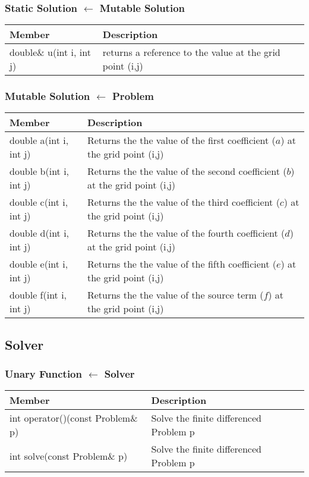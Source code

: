 \documentclass{article}
\begin{document}
\subsubsection{Static Solution $\leftarrow$ Mutable Solution}

\begin{tabular}[!htb]{|p{5.25 cm}|p{8 cm}|}
\hline
Member&	Description\\
\hline
double\& u(int i, int j)&	returns a reference to the value at the grid point (i,j)\\
\hline
\end{tabular}

\subsubsection{Mutable Solution $\leftarrow$ Problem}

\begin{tabular}[!htb]{|p{5.25 cm}|p{8 cm}|}
\hline
Member&	Description\\
\hline
double a(int i, int j)&	Returns the the value of the first coefficient ($a$) at the grid point (i,j)\\
\hline
double b(int i, int j)&	Returns the the value of the second coefficient ($b$) at the grid point (i,j)\\
\hline
double c(int i, int j)&	Returns the the value of the third coefficient ($c$) at the grid point (i,j)\\
\hline
double d(int i, int j)&	Returns the the value of the fourth coefficient ($d$) at the grid point (i,j)\\
\hline
double e(int i, int j)&	Returns the the value of the fifth coefficient ($e$) at the grid point (i,j)\\
\hline
double f(int i, int j)&	Returns the the value of the source term ($f$) at the grid point (i,j)\\
\hline
\end{tabular}

\subsection{Solver}
\subsubsection{Unary Function $\leftarrow$ Solver}

\begin{tabular}[!htb]{|p{5.25 cm}|p{8 cm}|}
\hline
Member&	Description\\
\hline
int operator()(const Problem\& p)&	Solve the finite differenced Problem p\\
\hline
int solve(const Problem\& p)&	Solve the finite differenced Problem p\\
\hline
\end{tabular}
\end{document}
